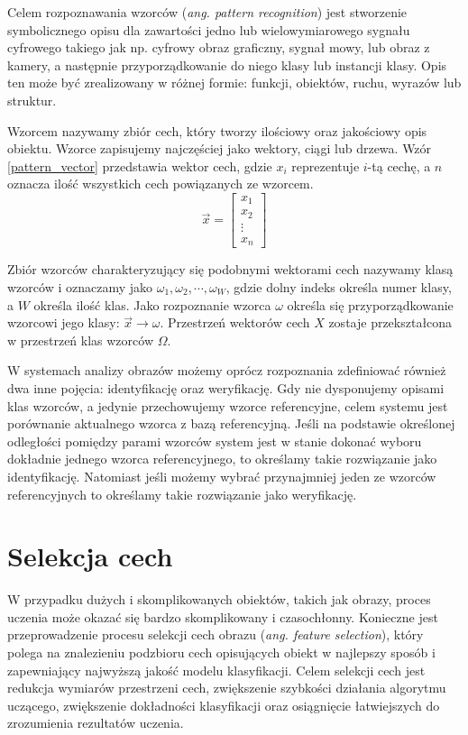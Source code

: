 Celem rozpoznawania wzorców (\emph{ang. pattern recognition}) jest stworzenie symbolicznego opisu dla zawartości jedno lub wielowymiarowego sygnału cyfrowego takiego jak np. cyfrowy obraz graficzny, sygnał mowy, lub obraz z kamery, a następnie przyporządkowanie do niego klasy lub instancji klasy. Opis ten może być zrealizowany w różnej formie: funkcji, obiektów, ruchu, wyrazów lub struktur.

Wzorcem nazywamy zbiór cech, który tworzy ilościowy oraz jakościowy opis obiektu. Wzorce zapisujemy najczęściej jako wektory, ciągi lub drzewa. Wzór \ref{pattern_vector} przedstawia wektor cech, gdzie $x_{i}$ reprezentuje $i$-tą cechę, a $n$ oznacza ilość wszystkich cech powiązanych ze wzorcem.\cite{GONZALES01}
\begin{equation} 
\label{pattern_vector} 
\overrightarrow{x}=
\begin{bmatrix}x_1\\
x_2\\
\vdots\\
x_n  
\end{bmatrix}
\end{equation}

Zbiór wzorców charakteryzujący się podobnymi wektorami cech nazywamy klasą wzorców i oznaczamy jako $\omega_1, \omega_2, \cdots, \omega_{W}$, gdzie dolny indeks określa numer klasy, a $W$ określa ilość klas. Jako rozpoznanie wzorca $\omega$ określa się przyporządkowanie wzorcowi jego klasy: $\overrightarrow{x} \rightarrow \omega$. Przestrzeń wektorów cech $X$ zostaje przekształcona w przestrzeń klas wzorców $\Omega$.

W systemach analizy obrazów możemy oprócz rozpoznania zdefiniować również dwa inne pojęcia: identyfikację oraz weryfikację. Gdy nie dysponujemy opisami klas wzorców, a jedynie przechowujemy wzorce referencyjne, celem systemu jest porównanie aktualnego wzorca z bazą referencyjną. Jeśli na podstawie określonej odległości pomiędzy parami wzorców system jest w stanie dokonać wyboru dokładnie jednego wzorca referencyjnego, to określamy takie rozwiązanie jako identyfikację. Natomiast jeśli możemy wybrać przynajmniej jeden ze wzorców referencyjnych to określamy takie rozwiązanie jako weryfikację.

\section{Selekcja cech}


W przypadku dużych i skomplikowanych obiektów, takich jak obrazy, proces uczenia może okazać się bardzo skomplikowany i czasochłonny. Konieczne jest przeprowadzenie procesu selekcji cech obrazu (\emph{ang. feature selection}), który polega na znalezieniu podzbioru cech opisujących obiekt w najlepszy sposób i zapewniający najwyższą jakość modelu klasyfikacji. Celem selekcji cech jest redukcja wymiarów przestrzeni cech, zwiększenie szybkości działania algorytmu uczącego, zwiększenie dokładności klasyfikacji oraz osiągnięcie łatwiejszych do zrozumienia rezultatów uczenia.\cite{MOTODA98}

